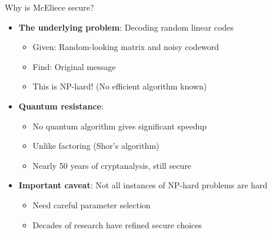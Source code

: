 \ifdefined\PRESENTATION\else\PassOptionsToClass{handout}{beamer}\fi\documentclass[aspectratio=169, lualatex]{beamer}
\begin{document}
\begin{frame}{Why is McEliece secure?}
	\begin{itemize}
		\item \textbf{The underlying problem}: Decoding random linear codes
		      \begin{itemize}
			      \item Given: Random-looking matrix and noisy codeword
			      \item Find: Original message
			      \item This is NP-hard! (No efficient algorithm known)
		      \end{itemize}
		\item \textbf{Quantum resistance}:
		      \begin{itemize}
			      \item No quantum algorithm gives significant speedup
			      \item Unlike factoring (Shor's algorithm)
			      \item Nearly 50 years of cryptanalysis, still secure
		      \end{itemize}
		\item \textbf{Important caveat}: Not all instances of NP-hard problems are hard
		      \begin{itemize}
			      \item Need careful parameter selection
			      \item Decades of research have refined secure choices
		      \end{itemize}
	\end{itemize}
\end{frame}
\end{document}
